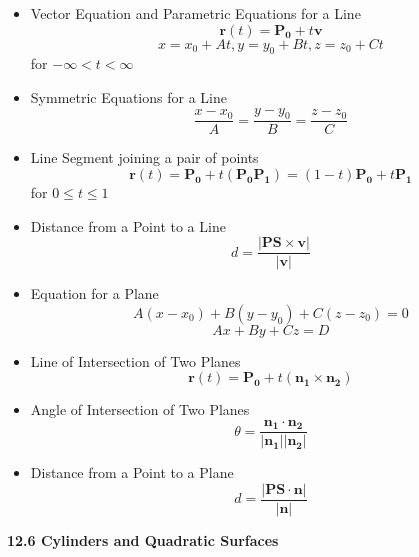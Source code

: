 \documentclass[12pt]{article}
\renewcommand{\vec}[1]{\mathbf{#1}}
\newcommand{\<}{\left<}
\renewcommand{\>}{\right>}
\begin{document}
    \begin{itemize}
    \item Vector Equation and Parametric Equations for a Line
      \[\vec{r}(t) = \vec{P_0} + t\vec{v}\]
      \[x = x_0 + At, y = y_0 + Bt, z = z_0 + Ct\] for $-\infty < t < \infty$

    \item Symmetric Equations for a Line
      \[\frac{x-x_0}{A}=\frac{y-y_0}{B}=\frac{z-z_0}{C}\]
    
    \item Line Segment joining a pair of points
      \[\vec{r}(t) = \vec{P_0} + t(\vec{P_0P_1})=(1-t)\vec{P_0}+t\vec{P_1}\] for $0 \leq t \leq 1$
    
    \item Distance from a Point to a Line
      \[d = \frac{|\vec{PS} \times \vec{v}|}{|\vec{v}|}\]
    
    \item Equation for a Plane
      \[A(x-x_0) + B(y-y_0) + C(z-z_0) = 0\]
      \[Ax+By+Cz = D\]
    
    \item Line of Intersection of Two Planes
      \[\vec{r}(t) = \vec{P_0} + t(\vec{n_1} \times \vec{n_2})\]

    \item Angle of Intersection of Two Planes
      \[\theta = \frac{\vec{n_1}\cdot\vec{n_2}}{|\vec{n_1}||\vec{n_2}|}\]
    
    \item Distance from a Point to a Plane
      \[d = \frac{|\vec{PS} \cdot \vec{n}|}{|\vec{n}|}\]

    
    \end{itemize}


\newpage

\centerline{\bf 12.6 Cylinders and Quadratic Surfaces }
\end{document}
